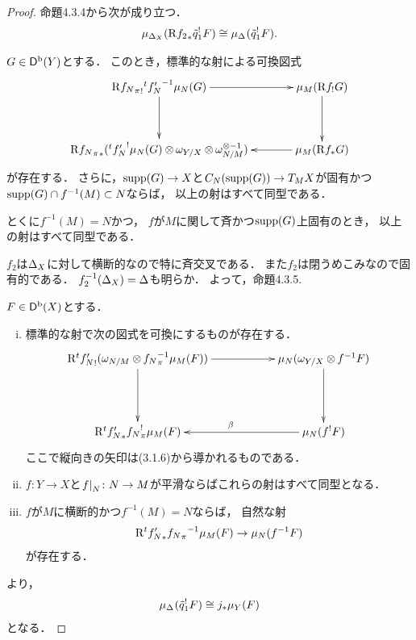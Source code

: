 \begin{proof}
  命題4.3.4から次が成り立つ．
  \[
    \mu_{\diag[X]}(\Rder{{f_2}_{\ast}}\tilde{q}_{1}^{!}F)
    \cong
    \mu_{\diag[]}(\tilde{q}_{1}^{!}F).
  \]
  \begin{PRP}[{\cite[Prop.4.3.4]{KS90}}]
    \(G\in\Dompb(Y)\)とする．
    このとき，標準的な射による可換図式    
    \[    
        \vcenter{\xymatrix@C=36pt@R=36pt{
        \Rder{{f_{N}}_{\pi}}_{!}{{}^t{f'_{N}}^{-1}}\mu_{N}(G)
        \ar[d]
        \ar[r]
        &
        \mu_{M}(\Rder{f_{!}}G)
        \ar[d]
        \\
        \Rder{{f_{N}}_{\pi}}_{\ast}({{}^t{f'_{N}}^{!}}\mu_{N}(G)\tens[]\omega_{Y/X}\tens[]\omega_{N/M}^{\otimes{-1}})
        &
        \mu_{M}(\Rder{f_{\ast}}G)
        \ar[l]
        }}
    \]が存在する．
    さらに，\(\supp(G)\to X\)と\(
        C_N(\supp(G))\to T_{M}X
    \)が固有かつ\(\supp(G)\cap f^{-1}(M)\subset N\)ならば，
    以上の射はすべて同型である．
    
    とくに\(f^{-1}(M)=N\)かつ，
    \(f\)が\(M\)に関して斉かつ\(\supp(G)\)上固有のとき，
    以上の射はすべて同型である．
  \end{PRP}
  \(f_2\)は\(\diag[X]\)に対して横断的なので特に斉交叉である．
  また\(f_2\)は閉うめこみなので固有的である．
  \(f_2^{-1}(\diag[X])=\diag[]\)も明らか．
  よって，命題4.3.5.
  \begin{PRP}[{\cite[Prop.4.3.5]{KS90}}]
    \(F\in\Dompb(X)\)とする．
    \begin{enumerate}[(i)]
        \item 標準的な射で次の図式を可換にするものが存在する．
        \[\vcenter{\xymatrix@C=56pt@R=46pt{
            \Rder{{}^{t}{f'_{N}}_{!}}(\omega_{N/M}\tens[]{{f_{N}}_{\pi}^{-1}}\mu_{M}(F))
            \ar[d]^{}
            \ar[r]_{}
            &
            \mu_{N}(\omega_{Y/X}\tens[]{f^{-1}}F)
            \ar[d]
            \\
            \Rder{{}^{t}{f'_{N}}_{\ast}}{{f_{N}}^{!}_{\pi}}\mu_{M}(F)
            &
            \mu_{N}({f^{!}}F)
            \ar[l]_{\beta}
        }}\]
        ここで縦向きの矢印は(3.1.6)から導かれるものである．
        \item \(f\colon Y\to X\)と\(\mres[f]{N}\colon N\to M\)が平滑ならばこれらの射はすべて同型となる．    
        \item \(f\)が\(M\)に横断的かつ\(f^{-1}(M)=N\)ならば，
        自然な射\[
            \Rder{{}^{t}{f'_{N}}_{\ast}}{{f_{N}}_{\pi}}^{-1}\mu_{M}(F)
            \to \mu_{N}(f^{-1}F)
        \]が存在する．
    \end{enumerate}
  \end{PRP}
  より，\[
    \mu_{\diag[]}(\tilde{q}_{1}^{!}F)
    \cong
    j_{\ast}\mu_{Y}(F)
  \]
  となる．
\end{proof}


